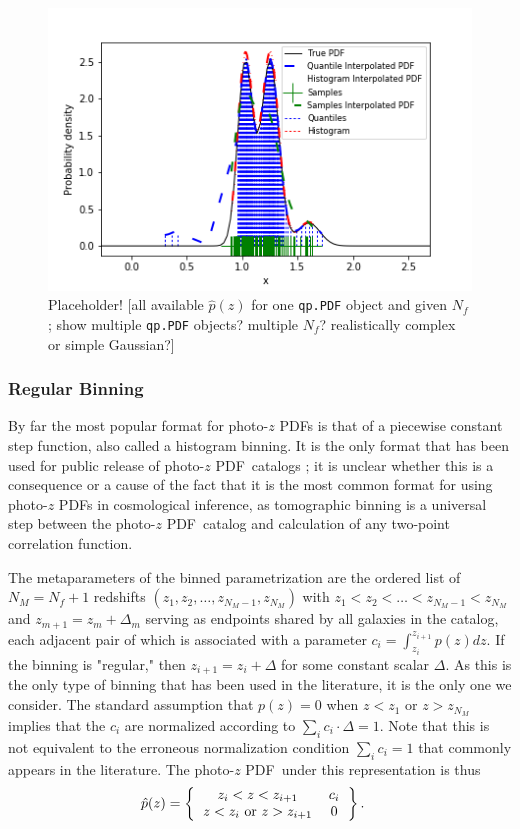 \documentclass[\docopts]{\docclass}
\newcommand{\pz}{photo-$z$ PDF}
\begin{document}
\begin{figure}
  \includegraphics[width=0.9\columnwidth]{figures/qp_placeholder.png}
  \caption{Placeholder! [all available $\hat{p}(z)$ for one \texttt{qp.PDF} 
object and given $N_{f}$; show multiple \texttt{qp.PDF} objects? multiple 
$N_{f}$? realistically complex or simple Gaussian?]
  \label{fig:qp}}
\end{figure}

\subsubsection{Regular Binning}
\label{sec:bins}

By far the most popular format for \pz s is that of a piecewise constant step 
function, also called a histogram binning.  It is the only format that has been 
used for public release of \pz\ catalogs \citep{tanaka_photometric_2017, 
sheldon_photometric_2012}; it is unclear whether this is a consequence or a 
cause of the fact that it is the most common format for using \pz s in 
cosmological inference, as tomographic binning is a universal step between the 
\pz\ catalog and calculation of any two-point correlation function.

The metaparameters of the binned parametrization are the ordered list of 
$N_{M}=N_{f}+1$ redshifts $(z_{1}, z_{2}, \dots, z_{N_{M}-1}, z_{N_{M}})$ with 
$z_{1} < z_{2} < \dots < z_{N_{M}-1} < z_{N_{M}}$ and 
$z_{m+1}=z_{m}+\Delta_{m}$ serving as endpoints shared by all galaxies in the 
catalog, each adjacent pair of which is associated with a parameter 
$c_{i}=\int_{z_{i}}^{z_{i+1}}p(z)dz$.  If the binning is "regular," then 
$z_{i+1}=z_{i}+\Delta$ for some constant scalar $\Delta$.  As this is the only 
type of binning that has been used in the literature, it is the only one we 
consider.  The standard assumption that $p(z)=0$ when $z<z_{1}$ or 
$z>z_{N_{M}}$ implies that the $c_{i}$ are normalized according to $\sum_{i} 
c_{i}\cdot\Delta = 1$.  Note that this is not equivalent to the erroneous 
normalization condition $\sum_{i} c_{i} = 1$ that commonly appears in the 
literature.  The \pz\ under this representation is thus
\begin{align}
  \label{eq:bin_interpolated}
  \hat{p}(z) &= \left\{\begin{tabular}{cc}$z_{i}<z<z_{i+1}$&$c_{i}$\\
$z < z_{i}$\ or\ $z > z_{i+1}$&$0$\end{tabular}\right\}.
\end{align}
\end{document}
